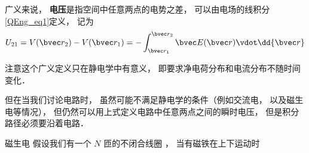 

广义来说， \textbf{电压}是指空间中任意两点的电势之差， 可以由电场的线积分\autoref{QEng_eq1}定义， 记为
\begin{equation}
U_{21} = V(\bvec r_2) - V(\bvec r_1) = - \int_{\bvec r_1}^{\bvec r_2} \bvec E(\bvec r) \vdot \dd{\bvec r}
\end{equation}

注意这个广义定义只在静电学中有意义， 即要求净电荷分布和电流分布不随时间变化．

但在当我们讨论电路时， 虽然可能不满足静电学的条件（例如交流电， 以及磁生电等情况）， 但仍然可以用上式定义电路中任意两点之间的瞬时电压， 但是积分路径必须要沿着电路．

\begin{exercise}{磁生电}
假设我们有一个 $N$ 匝的不闭合线圈%
， 当有磁铁在上下运动时
\end{exercise}